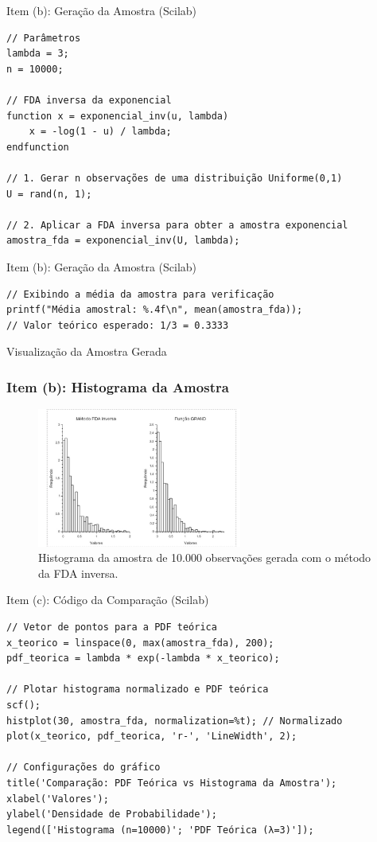 \begin{frame}[fragile]{Item (b): Geração da Amostra (Scilab)}
\begin{lstlisting}
// Parâmetros
lambda = 3;
n = 10000;

// FDA inversa da exponencial
function x = exponencial_inv(u, lambda)
    x = -log(1 - u) / lambda;
endfunction

// 1. Gerar n observações de uma distribuição Uniforme(0,1)
U = rand(n, 1);

// 2. Aplicar a FDA inversa para obter a amostra exponencial
amostra_fda = exponencial_inv(U, lambda);

\end{lstlisting}
\end{frame}

\begin{frame}[fragile]{Item (b): Geração da Amostra (Scilab)}
\begin{lstlisting}
// Exibindo a média da amostra para verificação
printf("Média amostral: %.4f\n", mean(amostra_fda));
// Valor teórico esperado: 1/3 = 0.3333
\end{lstlisting}
\end{frame}

\begin{frame}{Visualização da Amostra Gerada}
\frametitle{Item (b): Histograma da Amostra}
\begin{figure}
    \centering
    \includegraphics[width=0.6\textwidth]{figures/FDA_inversa_GRAnd.png}
    \caption{Histograma da amostra de 10.000 observações gerada com o método da FDA inversa.}
    \label{fig:hist_fda}
\end{figure}
\end{frame}

\begin{frame}[fragile]{Item (c): Código da Comparação (Scilab)}
\begin{lstlisting}
// Vetor de pontos para a PDF teórica
x_teorico = linspace(0, max(amostra_fda), 200);
pdf_teorica = lambda * exp(-lambda * x_teorico);

// Plotar histograma normalizado e PDF teórica
scf();
histplot(30, amostra_fda, normalization=%t); // Normalizado
plot(x_teorico, pdf_teorica, 'r-', 'LineWidth', 2);

// Configurações do gráfico
title('Comparação: PDF Teórica vs Histograma da Amostra');
xlabel('Valores');
ylabel('Densidade de Probabilidade');
legend(['Histograma (n=10000)'; 'PDF Teórica (λ=3)']);
\end{lstlisting}
\end{frame}

